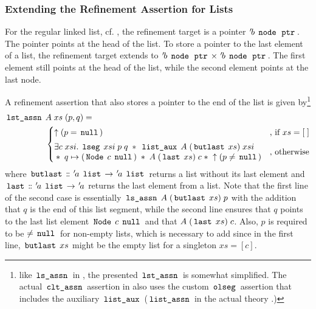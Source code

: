 \subsubsection{Extending the Refinement Assertion for Lists}\label{lists-with-tail-pointers}

For the regular linked list, cf. , the refinement target is a pointer ${\mskip2mu '\mskip-2mub} \; \,\text{\ttfamily node}\, \; \,\text{\ttfamily ptr}\,$.
The pointer points at the head of the list.
To store a pointer to the last element of a list, the refinement target extends to ${\mskip2mu '\mskip-2mub} \; \,\text{\ttfamily node}\, \; \,\text{\ttfamily ptr}\, \times {\mskip2mu '\mskip-2mub} \; \,\text{\ttfamily node}\, \; \,\text{\ttfamily ptr}\,$.
The first element still points at the head of the list, while the second element points at the last node.

A refinement assertion that also stores a pointer to the end of the list is given by\footnote{
	like $\,\text{\ttfamily ls\_assn}\,$ in , the presented $\,\text{\ttfamily lst\_assn}\,$ is somewhat simplified.
	The actual $\,\text{\ttfamily clt\_assn}\,$ assertion in  also uses the custom $\,\text{\ttfamily olseg}\,$ assertion that includes the auxiliary $\,\text{\ttfamily list\_aux}\,$ ($\,\text{\ttfamily list\_assn}\,$ in the actual theory .)
}
\begin{align*}
	\,\text{\ttfamily lst\_assn}\, \; & A \; xs \; (p,q) =                                   \\
	                      & \begin{cases}
		                        \uparrow(p=\,\text{\ttfamily null}\,) & \text{, if $xs=[\;]$} \\[1ex]
		                        \begin{aligned}
			 & \exists c\; xsi. \; \,\text{\ttfamily lseg}\, \; xsi \; p \; q \; \ast \; \,\text{\ttfamily list\_aux}\, \; A \; (\,\text{\ttfamily butlast}\, \; xs) \; xsi               \\
			 & \ast \; q \mapsto (\,\text{\ttfamily Node}\, \; c \; \,\text{\ttfamily null}\,) \; \ast \; A \; (\,\text{\ttfamily last}\, \; xs) \; c \; \ast \; \uparrow(p\neq\,\text{\ttfamily null}\,)
		\end{aligned}
		                                                & \text{, otherwise}
	                        \end{cases}
\end{align*}
where $\,\text{\ttfamily butlast}\, \mathrel{\mathord{:}\mkern-1.2mu\mathord{:}} {\mskip2mu '\mskip-2mua} \; \,\text{\ttfamily list}\, \rightarrow {\mskip2mu '\mskip-2mua} \; \,\text{\ttfamily list}\,$ returns a list without its last element and $\,\text{\ttfamily last}\, \mathrel{\mathord{:}\mkern-1.2mu\mathord{:}} {\mskip2mu '\mskip-2mua} \; \,\text{\ttfamily list}\, \rightarrow {\mskip2mu '\mskip-2mua}$ returns the last element from a list.
Note that the first line of the second case is essentially $\,\text{\ttfamily ls\_assn}\, \; A \; (\,\text{\ttfamily butlast}\, \; xs) \; p$ with the addition that $q$ is the end of this list segment, while the second line ensures that $q$ points to the last list element $\,\text{\ttfamily Node}\, \; c \; \,\text{\ttfamily null}\,$ and that $A \; (\,\text{\ttfamily last}\, \; xs) \; c$.
Also, $p$ is required to be $\neq \,\text{\ttfamily null}\,$ for non-empty lists, which is necessary to add since in the first line, $\,\text{\ttfamily butlast}\, \; xs$ might be the empty list for a singleton $xs=[c]$.

